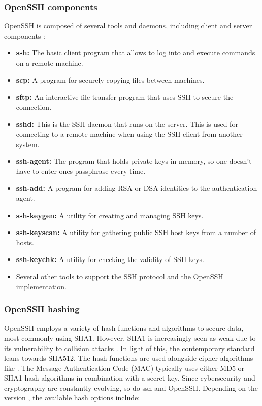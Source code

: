     \subsubsection{OpenSSH components}
    OpenSSH is composed of several tools and daemons, including client and server components \cite{PortableOpenSSHGitHub}:
    \begin{itemize}
        \item \textbf{ssh:} The basic client program that allows to log into and execute commands on a remote machine.
        \item \textbf{scp:} A program for securely copying files between machines.
        \item \textbf{sftp:} An interactive file transfer program that uses SSH to secure the connection.
        \item \textbf{sshd:} This is the SSH daemon that runs on the server. This is used for connecting to a remote machine when using the SSH client from another system.
        \item \textbf{ssh-agent:} The program that holds private keys in memory, so one doesn't have to enter ones passphrase every time.
        \item \textbf{ssh-add:} A program for adding RSA or DSA identities to the authentication agent.
        \item \textbf{ssh-keygen:} A utility for creating and managing SSH keys.
        \item \textbf{ssh-keyscan:} A utility for gathering public SSH host keys from a number of hosts.
        \item \textbf{ssh-keychk:} A utility for checking the validity of SSH keys.
        \item Several other tools to support the SSH protocol and the OpenSSH implementation.
    \end{itemize}

    \subsubsection{OpenSSH hashing}
    OpenSSH employs a variety of hash functions and algorithms to secure data, most commonly using SHA1. However, SHA1 is increasingly seen as weak due to its vulnerability to collision attacks \cite{OpenSSHUnderHood07}. In light of this, the contemporary standard leans towards SHA512. The hash functions are used alongside cipher algorithms like  \cite{SmartKex22}. The Message Authentication Code (MAC) typically uses either MD5 or SHA1 hash algorithms in combination with a secret key. Since cybersecurity and cryptography are constantly evolving, so do \acrshort{ssh} and OpenSSH. Depending on the version \cite{OpenSSHUnderHood07}, the available hash options include:
    
